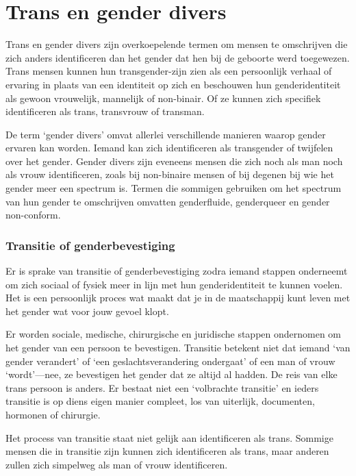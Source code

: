 \documentclass[12pt,openany]{book}
\begin{document}
\section*{Trans en gender divers}

Trans en gender divers zijn overkoepelende termen om mensen te omschrijven die zich anders identificeren dan het gender dat hen bij de geboorte werd toegewezen. Trans mensen kunnen hun transgender-zijn zien als een persoonlijk verhaal of ervaring in plaats van een identiteit op zich en beschouwen hun genderidentiteit als gewoon vrouwelijk, mannelijk of non-binair. Of ze kunnen zich specifiek identificeren als trans, transvrouw of transman.

De term ‘gender divers’ omvat allerlei verschillende manieren waarop gender ervaren kan worden. Iemand kan zich identificeren als transgender of twijfelen over het gender. Gender divers zijn eveneens mensen die zich noch als man noch als vrouw identificeren, zoals bij non-binaire mensen of bij degenen bij wie het gender meer een spectrum is. Termen die sommigen gebruiken om het spectrum van hun gender te omschrijven omvatten genderfluide, genderqueer en gender non-conform. 

\subsubsection*{Transitie of genderbevestiging}

Er is sprake van transitie of genderbevestiging zodra iemand stappen onderneemt om zich sociaal of fysiek meer in lijn met hun genderidentiteit te kunnen voelen. Het is een persoonlijk proces wat maakt dat je in de maatschappij kunt leven met het gender wat voor jouw gevoel klopt.

Er worden sociale, medische, chirurgische en juridische stappen ondernomen om het gender van een persoon te bevestigen. Transitie betekent niet dat iemand ‘van gender verandert’ of ‘een geslachtsverandering ondergaat’ of een man of vrouw ‘wordt’—nee, ze bevestigen het gender dat ze altijd al hadden. De reis van elke trans persoon is anders. Er bestaat niet een ‘volbrachte transitie’ en ieders transitie is op diens eigen manier compleet, los van uiterlijk, documenten, hormonen of chirurgie.  

Het process van transitie staat niet gelijk aan identificeren als trans. Sommige mensen die in transitie zijn kunnen zich identificeren als trans, maar anderen zullen zich simpelweg als man of vrouw identificeren.
\end{document}
